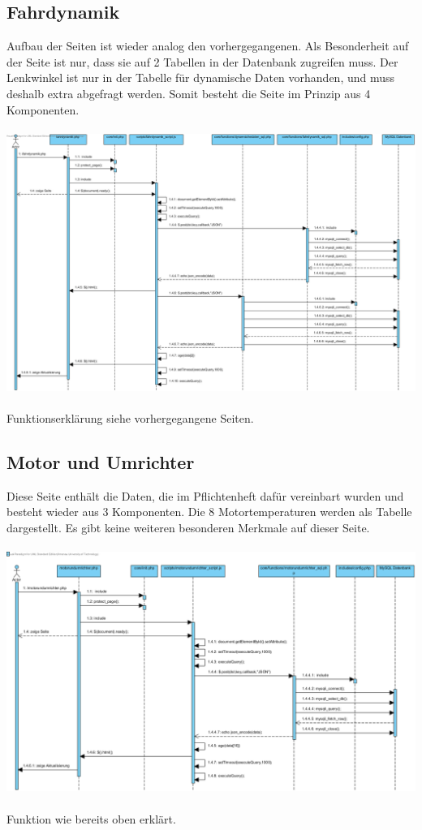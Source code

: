 \documentclass[fontsize = 12pt, paper = a4]{scrreprt}
\begin{document}
\subsection{Fahrdynamik}
Aufbau der Seiten ist wieder analog den vorhergegangenen. Als Besonderheit auf der Seite ist nur, dass sie auf 2 Tabellen in der Datenbank zugreifen muss. Der Lenkwinkel ist nur in der Tabelle für dynamische Daten vorhanden, und muss deshalb extra abgefragt werden. Somit besteht die Seite im Prinzip aus 4 Komponenten.\\ \\


\includegraphics[scale=0.42]{fahrdynamik.png}
\\ \\
Funktionserklärung siehe vorhergegangene Seiten.\\



\subsection{Motor und Umrichter}
Diese Seite enthält die Daten, die im Pflichtenheft dafür vereinbart wurden und besteht wieder aus 3 Komponenten. Die 8 Motortemperaturen werden als Tabelle dargestellt. Es gibt keine weiteren besonderen Merkmale auf dieser Seite.\\ \\



\includegraphics[scale=0.5]{motorundumrichter.png}
\\ \\
Funktion wie bereits oben erklärt.
\end{document}
